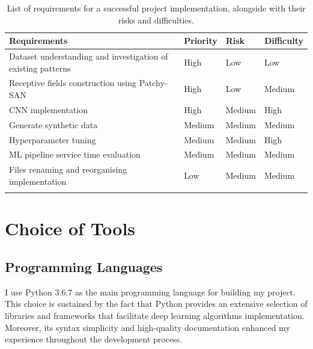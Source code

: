 \begin{longtable}{|p{}|p{}|p{}|p{}|}
  \hline
  \textbf{Requirements}                                        & \textbf{Priority} & \textbf{Risk} & \textbf{Difficulty} \\
  \hline
  Dataset understanding and investigation of existing patterns & High              & Low           & Low                 \\

  Receptive fields construction using Patchy-SAN               & High              & Low           & Medium              \\

  CNN implementation                                           & High              & Medium        & High                \\

  Generate synthetic data                                      & Medium            & Medium        & Medium              \\

  Hyperparameter tuning                                        & Medium            & Medium        & High                 \\

  ML pipeline service time evaluation                          & Medium            & Medium           & Medium                 \\

  Files renaming and reorganising implementation               & Low               & Medium           & Medium              \\

  \hline
  \caption[Requirements overview]{List of requirements for a successful project implementation, alongside with their risks and difficulties.}
  \label{Requirements overview}
\end{longtable} \bigskip


\section{Choice of Tools}

\subsection{Programming Languages}

I use Python 3.6.7 as the main programming language for building my project. This choice is sustained by the fact that Python provides an extensive selection of libraries and frameworks that facilitate deep learning algorithms implementation. Moreover, its syntax simplicity and high-quality documentation enhanced my experience throughout the development process. \\\

